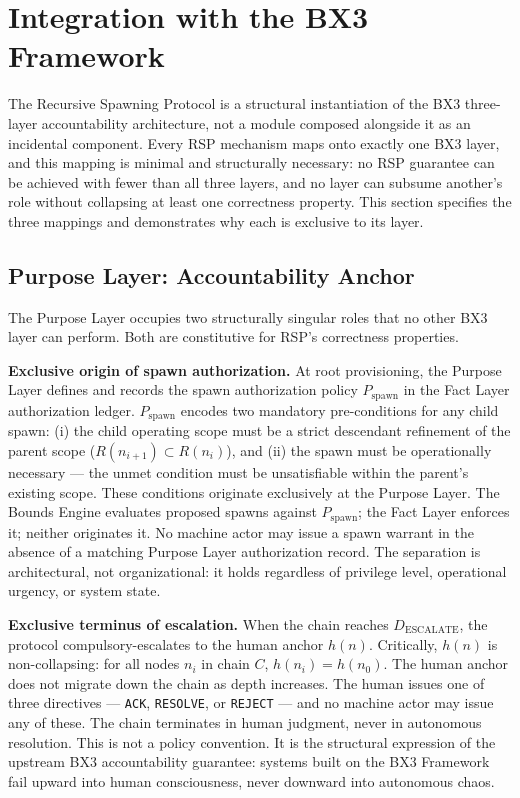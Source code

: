 \section{Integration with the BX3 Framework}
\label{sec:rs-integration}

The Recursive Spawning Protocol is a structural instantiation of the BX3 three-layer accountability architecture, not a module composed alongside it as an incidental component. Every RSP mechanism maps onto exactly one BX3 layer, and this mapping is minimal and structurally necessary: no RSP guarantee can be achieved with fewer than all three layers, and no layer can subsume another's role without collapsing at least one correctness property. This section specifies the three mappings and demonstrates why each is exclusive to its layer.

\subsection{Purpose Layer: Accountability Anchor}
\label{sec:rs-purpose-anchor}

The Purpose Layer occupies two structurally singular roles that no other BX3 layer can perform. Both are constitutive for RSP's correctness properties.

\medskip
\noindent\textbf{Exclusive origin of spawn authorization.} At root provisioning, the Purpose Layer defines and records the spawn authorization policy $P_{\mathrm{spawn}}$ in the Fact Layer authorization ledger. $P_{\mathrm{spawn}}$ encodes two mandatory pre-conditions for any child spawn: (i) the child operating scope must be a strict descendant refinement of the parent scope ($R(n_{i+1}) \subset R(n_i)$), and (ii) the spawn must be operationally necessary --- the unmet condition must be unsatisfiable within the parent's existing scope. These conditions originate exclusively at the Purpose Layer. The Bounds Engine evaluates proposed spawns against $P_{\mathrm{spawn}}$; the Fact Layer enforces it; neither originates it. No machine actor may issue a spawn warrant in the absence of a matching Purpose Layer authorization record. The separation is architectural, not organizational: it holds regardless of privilege level, operational urgency, or system state.

\medskip
\noindent\textbf{Exclusive terminus of escalation.} When the chain reaches $D_{\mathrm{ESCALATE}}$, the protocol compulsory-escalates to the human anchor $h(n)$. Critically, $h(n)$ is non-collapsing: for all nodes $n_i$ in chain $C$, $h(n_i) = h(n_0)$. The human anchor does not migrate down the chain as depth increases. The human issues one of three directives --- \texttt{ACK}, \texttt{RESOLVE}, or \texttt{REJECT} --- and no machine actor may issue any of these. The chain terminates in human judgment, never in autonomous resolution. This is not a policy convention. It is the structural expression of the upstream BX3 accountability guarantee: systems built on the BX3 Framework fail upward into human consciousness, never downward into autonomous chaos.

